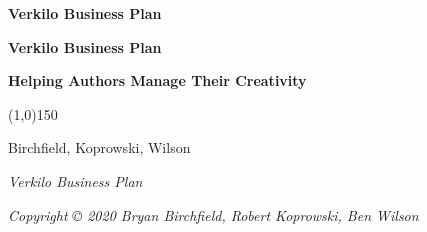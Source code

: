 \documentclass[11pt,openany]{book}
\begin{document}
  \sloppy %
  \setcounter{page}{1}
  \pagestyle{empty}
  \begin{center}
    \vspace*{\fill}

    \LARGE\textbf{\textsf{Verkilo Business Plan}}

    \vspace*{\fill}
    \vspace*{\fill}
  \end{center}
  \clearpage

  \newpage
  \emph{ }\newline
    \clearpage

  \begin{center}
    \vspace*{\fill}

    \Huge\textbf{\textsf{Verkilo Business Plan}}
    
    \vspace*{0.125in}
    \Large\textbf{\textsf{Helping Authors Manage Their Creativity}}
    
    \vspace*{0.25in}
    \line(1,0){150}
    \vspace*{0.25in}

    \Large\textsf{Birchfield, Koprowski, Wilson}

    \vspace*{\fill}
    \vspace*{\fill}
      \end{center}
  \clearpage

  \vspace*{\fill}

  \par\noindent\emph{Verkilo Business Plan}\newline
  \par\noindent\emph{Copyright © 2020 Bryan Birchfield, Robert
Koprowski, Ben Wilson}\newline
\end{document}
